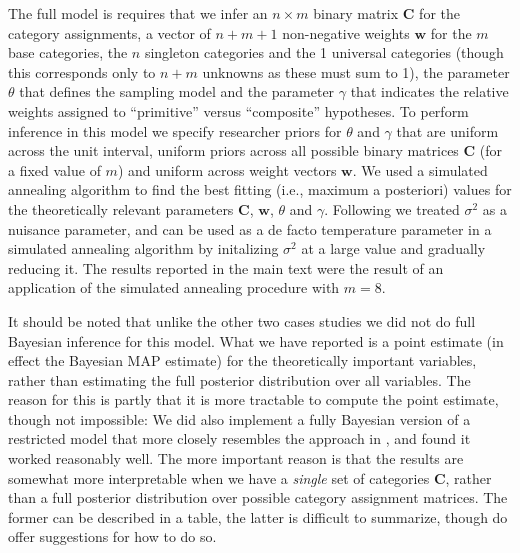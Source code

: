 The full model is requires that we infer an $n \times m$ binary matrix $\mathbf{C}$ for the category assignments, a vector of $n+m+1$ non-negative weights $\mathbf{w}$ for the $m$ base categories, the $n$ singleton categories and the 1 universal categories (though this corresponds only to $n+m$ unknowns as these must sum to 1), the parameter $\theta$ that defines the sampling model and the parameter $\gamma$ that indicates the relative weights assigned to ``primitive'' versus ``composite'' hypotheses. To perform inference in this model we specify researcher priors for $\theta$ and $\gamma$ that are uniform across the unit interval, uniform priors across all possible binary matrices $\mathbf{C}$ (for a fixed value of $m$) and uniform across weight vectors $\mathbf{w}$. We used a simulated annealing algorithm to find the best fitting (i.e., maximum a posteriori) values for the theoretically relevant parameters $\mathbf{C}$, $\mathbf{w}$, $\theta$ and $\gamma$. Following  we treated $\sigma^2$ as a nuisance parameter, and can be used as a de facto temperature parameter in a simulated annealing algorithm by initalizing $\sigma^2$ at a large value and gradually reducing it. The results reported in the main text were the result of an application of the simulated annealing procedure with $m=8$.

It should be noted that unlike the other two cases studies we did not do full Bayesian inference for this model. What we have reported is a point estimate (in effect the Bayesian MAP estimate) for the theoretically important variables, rather than estimating the full posterior distribution over all variables. The reason for this is partly that it is more tractable to compute the point estimate, though not impossible: We did also implement a fully Bayesian version of a restricted model that more closely resembles the approach in , and found it worked reasonably well. The more important reason is that the results are somewhat more interpretable when we have a {\it single} set of categories $\mathbf{C}$, rather than a full posterior distribution over possible category assignment matrices. The former can be described in a table, the latter is difficult to summarize, though  do offer suggestions for how to do so.
